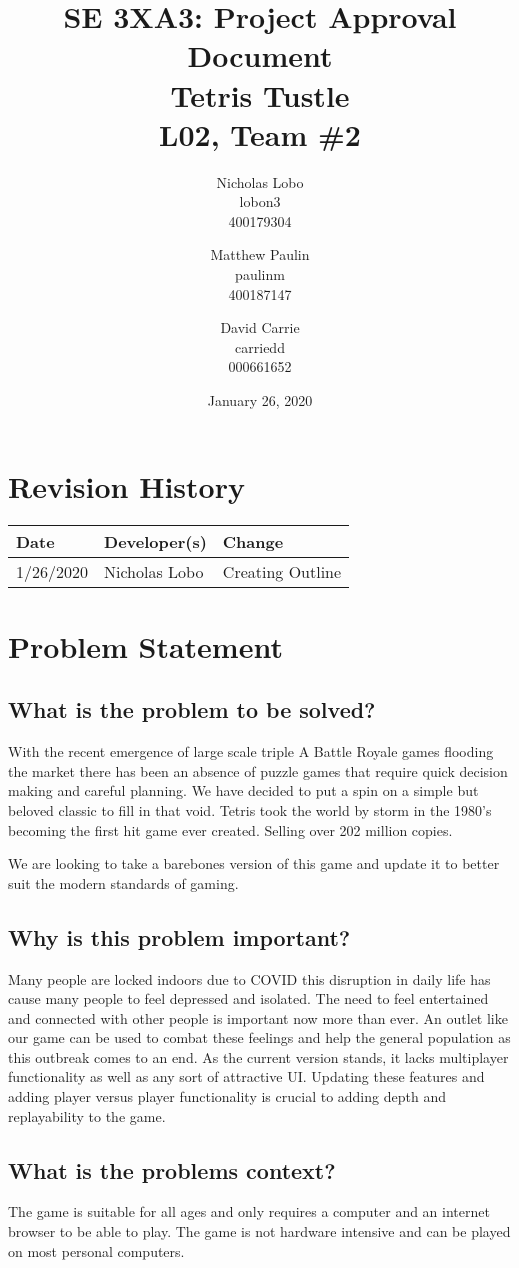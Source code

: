 \documentclass{article}
\title{SE 3XA3: Project Approval Document \\  Tetris Tustle  \\{\large L02, Team \#2}}
\author{Nicholas Lobo \\ lobon3 \\ 400179304 \and
		Matthew Paulin \\ paulinm \\ 400187147 \and
		David Carrie \\ carriedd \\   000661652 \and
}
\date{January 26, 2020}
\begin{document}
\maketitle
\newpage

\tableofcontents
\newpage



\begin{table}[hp]
\section{Revision History} \label{TblRevisionHistory}
\begin{tabularx}{\textwidth}{llX}
\hline
\textbf{Date} & \textbf{Developer(s)} & \textbf{Change}\\
\hline
1/26/2020 & Nicholas Lobo & Creating Outline\\

\hline
\end{tabularx}
\end{table}

\newpage

\section{Problem Statement}
\subsection{What is the problem to be solved?}

With the recent emergence of large scale triple A Battle Royale games flooding the market there has been an absence of puzzle games that require quick decision making and careful planning.  We have decided to put a spin on a simple but beloved classic to fill in that void. Tetris took the world by storm in the 1980’s becoming the first hit game ever created. Selling over 202 million copies. 

 We are looking to take a barebones version of this game and update it to better suit the modern standards of gaming.  
 

\subsection{Why is this problem important?}

Many people are locked indoors due to COVID this disruption in daily life has cause many people to feel depressed and isolated. The need to feel entertained and connected with other people is important now more than ever. An outlet like our game can be used to combat these feelings and help the general population as this outbreak comes to an end. As the current version stands, it lacks multiplayer functionality as well as any sort of attractive UI. Updating these features and adding player versus player functionality is crucial to adding depth and replayability to the game.  

\subsection{What is the problems context?}

The game is suitable for all ages and only requires a computer and an internet browser to be able to play. The game is not hardware intensive and can be played on most personal computers.  
\end{document}
